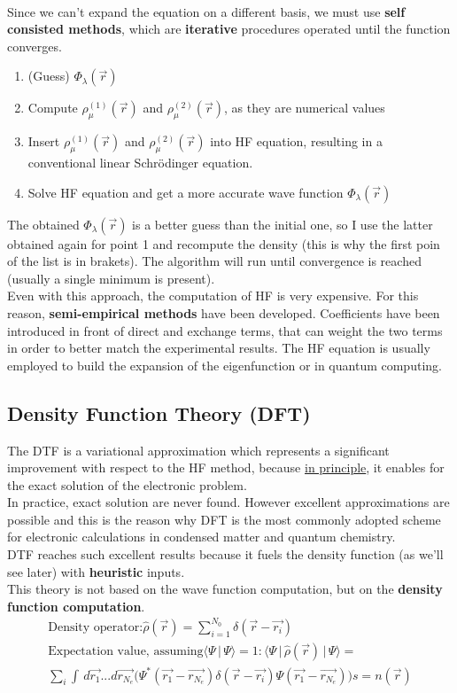 \\
Since we can't expand the equation on a different basis, we must use \textbf{self consisted methods}, which are \textbf{iterative} procedures operated until the function converges.
\begin{enumerate}
	\item (Guess) $\Phi_\lambda (\vec{r})$
	\item Compute $\rho_\mu^{(1)}(\vec{r})$ and $\rho_\mu^{(2)}(\vec{r})$, as they are numerical values
	\item Insert $\rho_\mu^{(1)}(\vec{r})$ and $\rho_\mu^{(2)}(\vec{r})$ into HF equation, resulting in a conventional linear Schr\"odinger equation.
	\item Solve HF equation and get a more accurate wave function $\Phi_\lambda (\vec{r})$
	\end{enumerate}
The obtained $\Phi_\lambda (\vec{r})$ is a better guess than the initial one, so I use the latter obtained again for point 1 and recompute the density (this is why the first poin of the list is in brakets). 
The algorithm will run until convergence is reached (usually a single minimum is present). \\
Even with this approach, the computation of HF is very expensive. For this reason, \textbf{semi-empirical methods} have been developed. Coefficients have been introduced in front of direct and exchange terms, that can weight the two terms in order to better match the experimental results. The HF equation is usually employed to build the expansion of the eigenfunction or in quantum computing.\\

\subsection{Density Function Theory (DFT)}
The DTF is a variational approximation which represents a significant improvement with respect to the HF method, because \underline{in principle}, it enables for the exact solution of the electronic problem. \\
In practice, exact solution are never found. However excellent approximations are
possible and this is the reason why DFT is the most commonly adopted scheme for
electronic calculations in condensed matter and quantum chemistry. \\
DTF reaches such excellent results because it fuels the density function (as we'll see later) with \textbf{heuristic} inputs.\\
This theory is not based on the wave function computation, but on the \textbf{density function computation}.
\begin{multline}
 \text{Density operator:}\hat{\rho}(\vec{r})=\sum_{i=1}^{N_0}\delta(\vec{r}-\vec{r_i})\\
\text{Expectation value, assuming} \langle \Psi\,|\,\Psi \rangle =1 \text{:}\, \langle \Psi\,|\,\hat{\rho}(\vec{r})\,|\,\Psi \rangle=\\
\sum_i \int\,d\vec{r_1}...d\vec{r_{N_e}}\bigg(\Psi^*(\vec{r_1}-\vec{r_{N_e}})\delta(\vec{r}-\vec{r_i})\Psi(\vec{r_1}-\vec{r_{N_e}})\bigg)s=n(\vec{r})
\end{multline}

